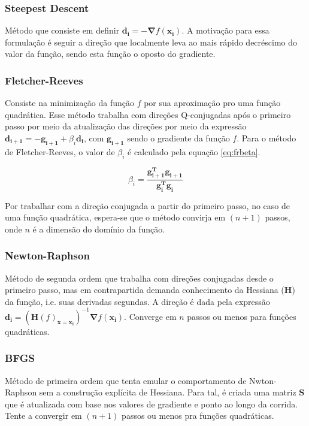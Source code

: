 \documentclass[10pt, a4paper]{article}
\begin{document}
\subsubsection{Steepest Descent}

Método que consiste em definir $\mathbf{d_i} =  - \mathbf{\nabla}f(\mathbf{x_i})$. A motivação para essa formulação é seguir a direção
que localmente leva ao mais rápido decréscimo do valor da função, sendo esta função o oposto do gradiente.

\subsubsection{Fletcher-Reeves}

Consiste na minimização da função $f$ por sua aproximação pro uma função quadrática. Esse método trabalha com direções Q-conjugadas após o
primeiro passo por meio da atualização das direções por meio da expressão $\mathbf{d_{i+1}} = -\mathbf{g_{i+1}} + \beta_i\mathbf{d_{i}}$, com $\mathbf{g_{i+1}}$
sendo o gradiente da função $f$. 
Para o método de Fletcher-Reeves, o valor de $\beta_i$ é calculado pela equação \ref{eq:frbeta}.

\begin{equation}\label{eq:frbeta}
  \beta_i = \frac{\mathbf{g^T_{i+1}}\mathbf{g_{i+1}}}{\mathbf{g^T_{i}}\mathbf{g_{i}}}
\end{equation}

Por trabalhar com a direção conjugada a partir do primeiro passo, no caso de uma função quadrática, espera-se que o método convirja em $(n+1)$
passos, onde $n$ é a dimensão do domínio da função.

\subsubsection{Newton-Raphson}

Método de segunda ordem que trabalha com direções conjugadas desde o primeiro passo, mas em contrapartida demanda conhecimento da Hessiana ($\mathbf{H}$)
da função, i.e. suas derivadas segundas. A direção é dada pela expressão $\mathbf{d_i} = (\mathbf{H}(f)_{\mathbf{x}=\mathbf{x_i}})^{-1}\mathbf{\nabla}f(\mathbf{x_i})$.
Converge em $n$ passos ou menos para funções quadráticas.

\subsubsection{BFGS}

Método de primeira ordem que tenta emular o comportamento de Nwton-Raphson sem a construção explícita de Hessiana. Para tal, é criada uma matriz $\mathbf{S}$ que é atualizada com
base nos valores de gradiente e ponto ao longo da corrida. Tente a convergir em $(n+1)$ passos ou menos pra funções quadráticas.
\end{document}
